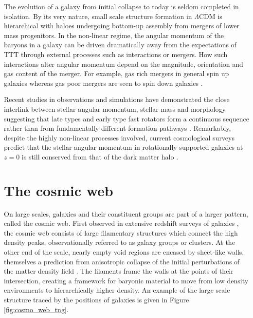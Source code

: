 The evolution of a galaxy from initial collapse to today is seldom completed in isolation. By its very nature, small scale structure formation in $\Lambda$CDM is hierarchical with haloes undergoing bottom-up assembly from mergers of lower mass progenitors. In the non-linear regime, the angular momentum of the baryons in a galaxy can be driven dramatically away from the expectations of TTT through external processes such as interactions or mergers. How such interactions alter angular momentum depend on the magnitude, orientation and gas content of the merger. For example, gas rich mergers in general spin up galaxies whereas gas poor mergers are seen to spin down galaxies \citep[][]{lagos2017,lagos2018}.

Recent studies in observations and simulations have demonstrated the close interlink between stellar angular momentum, stellar mass and morphology suggesting that late types and early type fast rotators form a continuous sequence rather than from fundamentally different formation pathways \citep[][]{cortese2016, lagos2017, graham2018}. Remarkably, despite the highly non-linear processes involved, current cosmological surveys predict that the stellar angular momentum in rotationally supported galaxies at $z=0$ is still conserved from that of the dark matter halo \citep[e.g.][]{genel2015}. 

\section{The cosmic web}
On large scales, galaxies and their constituent groups are part of a larger pattern, called the cosmic web. First observed in extensive redshift surveys of galaxies \citep[e.g.][]{delapparent1986, colless2001, tegmark2004}, the cosmic web consists of large filamentary structures which connect the high density peaks, observationally referred to as galaxy groups or clusters. At the other end of the scale, nearly empty void regions are encased by sheet-like walls, themselves a prediction from anisotropic collapse of the initial perturbations of the matter density field \citep{zeldovich1970, shandarin1989}. The filaments frame the walls at the points of their intersection, creating a framework for baryonic material to move from low density environments to hierarchically higher density. An example of the large scale structure traced by the positions of galaxies is given in Figure \ref{fig:cosmo_web_tng}.

